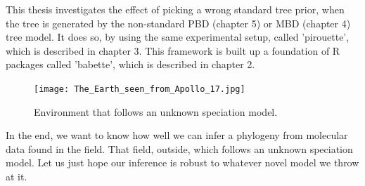 This thesis investigates the effect of picking a wrong standard
tree prior, when the tree is generated 
by the non-standard PBD (chapter 5) or MBD (chapter 4) tree model.
It does so, by using the same experimental setup, called 'pirouette',
which is described in chapter 3. This framework is built up a foundation
of R packages called 'babette', which is described in chapter 2.

\begin{figure}[H]
  \texttt{[image: The\_Earth\_seen\_from\_Apollo\_17.jpg]}
  \caption{
    Environment that follows an unknown speciation model.
 }
  \label{fig:unknown_speciation_model}
\end{figure}

In the end, we want to know how well we can infer a phylogeny from
molecular data found in the field. That field, outside, 
which follows an unknown speciation model. Let us just hope our inference
is robust to whatever novel model we throw at it.

